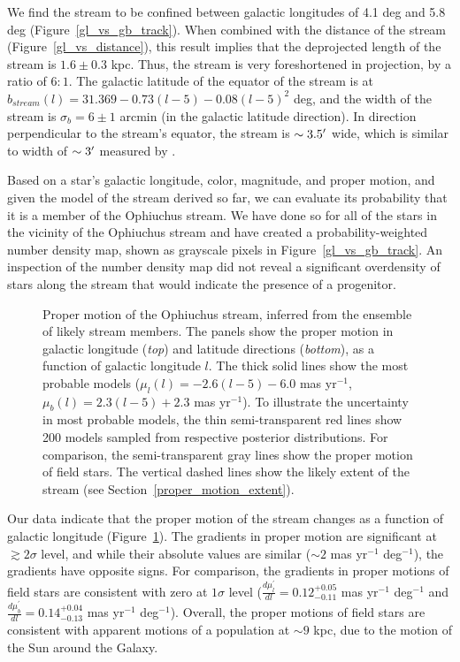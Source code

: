 \documentclass[iop]{emulateapj}
\begin{document}
We find the stream to be confined between galactic longitudes of 4.1 deg and 5.8
deg (Figure~\ref{gl_vs_gb_track}). When combined with the distance of the
stream (Figure~\ref{gl_vs_distance}), this result implies that the
deprojected length of the stream is $1.6\pm0.3$ kpc. Thus, the stream is very
foreshortened in projection, by a ratio of $6:1$. The galactic latitude of the
equator of the stream is at $b_{stream}(l) = 31.369 - 0.73(l-5) - 0.08(l-5)^2$
deg, and the width of the stream is $\sigma_b=6\pm1$ arcmin (in the galactic
latitude direction). In direction perpendicular to the stream's equator, the
stream is $\sim3.5\mbox{$^\prime$}$ wide, which is similar to width of $\sim3\mbox{$^\prime$}$
measured by \citet{ber14b}.


Based on a star's galactic longitude, color, magnitude, and proper motion, and
given the model of the stream derived so far, we can evaluate its probability
that it is a member of the Ophiuchus stream. We have done so for all of the
stars in the vicinity of the Ophiuchus stream and have created a
probability-weighted number density map, shown as grayscale pixels in
Figure~\ref{gl_vs_gb_track}. An inspection of the number density map did
not reveal a significant overdensity of stars along the stream that would
indicate the presence of a progenitor.

\begin{figure}
\caption{
Proper motion of the Ophiuchus stream, inferred from the ensemble of likely
stream members. The panels show the proper motion in galactic longitude
({\em top}) and latitude directions ({\em bottom}), as a function of galactic
longitude $l$. The thick solid lines show the most probable models
($\mu_l(l)=-2.6(l-5)-6.0$ mas yr$^{-1}$, $\mu_b(l)=2.3(l-5)+2.3$ mas yr$^{-1}$).
To illustrate the uncertainty in most probable models, the thin semi-transparent
red lines show 200 models sampled from respective posterior distributions. For
comparison, the semi-transparent gray lines show the proper motion of field
stars. The vertical dashed lines show the likely extent of the stream (see
Section~\ref{proper_motion_extent}).
\label{gl_vs_pm}}
\end{figure}

Our data indicate that the proper motion of the stream changes as a function of
galactic longitude (Figure~\ref{gl_vs_pm}). The gradients in proper motion
are significant at $\gtrsim2\sigma$ level, and while their absolute values are
similar ($\sim2$ mas yr$^{-1}$ deg$^{-1}$), the gradients have opposite signs.
For comparison, the gradients in proper motions of field stars are consistent
with zero at $1\sigma$ level ($\frac{d\mu^\prime_l}{dl}=0.12_{-0.11}^{+0.05}$
mas yr$^{-1}$ deg$^{-1}$ and $\frac{d\mu^\prime_b}{dl}=0.14_{-0.13}^{+0.04}$ mas
yr$^{-1}$ deg$^{-1}$). Overall, the proper motions of field stars are consistent
with apparent motions of a population at $\sim9$ kpc, due to the motion of the
Sun around the Galaxy.
\end{document}
